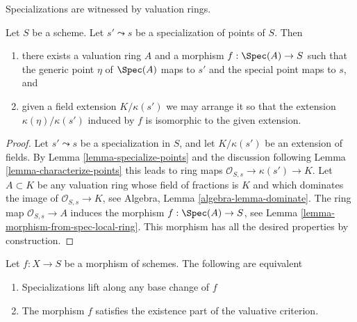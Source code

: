 \begin{lemma}
\label{lemma-points-specialize}
\begin{slogan}
Specializations are witnessed by valuation rings.
\end{slogan}
Let $S$ be a scheme. Let $s' \leadsto s$ be a specialization of points of $S$.
Then
\begin{enumerate}
\item there exists a valuation ring $A$ and a morphism
$f : \Spec(A) \to S$ such that the generic point $\eta$ of
$\Spec(A)$ maps to $s'$ and the special point maps to $s$, and
\item given a field extension $K/\kappa(s')$
we may arrange it so that the extension
$\kappa(\eta)/\kappa(s')$ induced by $f$
is isomorphic to the given extension.
\end{enumerate}
\end{lemma}

\begin{proof}
Let $s' \leadsto s$ be a specialization in $S$, and let
$K/\kappa(s')$ be an extension of fields. By
Lemma \ref{lemma-specialize-points}
and the discussion following
Lemma \ref{lemma-characterize-points}
this leads to ring maps $\mathcal{O}_{S, s} \to \kappa(s') \to K$.
Let $A \subset K$ be any valuation ring whose field of fractions is
$K$ and which dominates the image of $\mathcal{O}_{S, s} \to K$, see
Algebra, Lemma \ref{algebra-lemma-dominate}.
The ring map $\mathcal{O}_{S, s} \to A$ induces the morphism
$f : \Spec(A) \to S$, see
Lemma \ref{lemma-morphism-from-spec-local-ring}.
This morphism has all the desired properties by construction.
\end{proof}

\begin{lemma}
\label{lemma-lift-specializations-valuative}
Let $f : X \to S$ be a morphism of schemes.
The following are equivalent
\begin{enumerate}
\item Specializations lift along any base change of $f$
\item The morphism $f$ satisfies the existence part of the
valuative criterion.
\end{enumerate}
\end{lemma}

